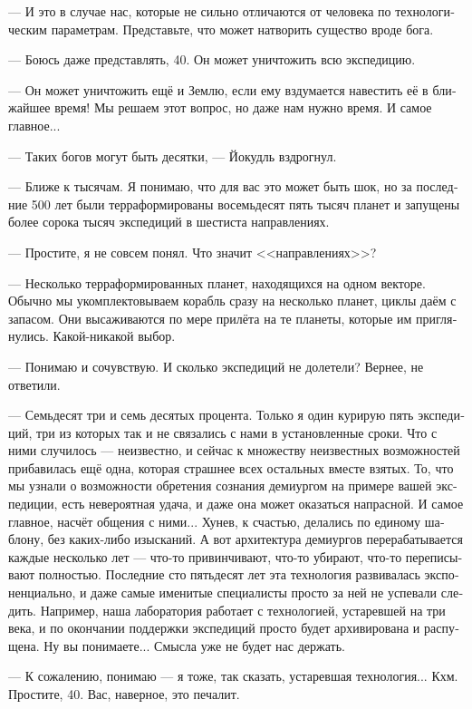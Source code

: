 \documentclass[a4paper,12pt,fleqn]{book}\usepackage{polyglossia}\setdefaultlanguage[babelshorthands=true]{russian}\setotherlanguage{english}\defaultfontfeatures{Ligatures=TeX,Mapping=tex-text}\usepackage{xcolor}\newcommand{\ml}[3]{#2}
\begin{document}
--- И это в случае нас, которые не сильно отличаются от человека по технологическим параметрам.
Представьте, что может натворить существо вроде бога.

--- Боюсь даже представлять, 40.
Он может уничтожить всю экспедицию.

--- Он может уничтожить ещё и Землю, если ему вздумается навестить её в ближайшее время!
Мы решаем этот вопрос, но даже нам нужно время.
И самое главное...

\ml{$0$}
{--- Таких богов могут быть десятки, --- Йокудль вздрогнул.}
{``There may be dozens of such gods,'' Jökull shuddered.}

\ml{$0$}
{--- Ближе к тысячам.}
{``Closer to thousands.}
Я понимаю, что для вас это может быть шок, но за последние 500 лет были терраформированы восемьдесят пять тысяч планет и запущены более сорока тысяч экспедиций в шестиста направлениях.

--- Простите, я не совсем понял.
Что значит <<направлениях>>?

--- Несколько терраформированных планет, находящихся на одном векторе.
Обычно мы укомплектовываем корабль сразу на несколько планет, циклы даём с запасом.
Они высаживаются по мере прилёта на те планеты, которые им приглянулись.
Какой-никакой выбор.

--- Понимаю и сочувствую.
И сколько экспедиций не долетели?
Вернее, не ответили.

--- Семьдесят три и семь десятых процента.
Только я один курирую пять экспедиций, три из которых так и не связались с нами в установленные сроки.
Что с ними случилось --- неизвестно, и сейчас к множеству неизвестных возможностей прибавилась ещё одна, которая страшнее всех остальных вместе взятых.
То, что мы узнали о возможности обретения сознания демиургом на примере вашей экспедиции, есть невероятная удача, и даже она может оказаться напрасной.
И самое главное, насчёт общения с ними...
Хунев, к счастью, делались по единому шаблону, без каких-либо изысканий.
А вот архитектура демиургов перерабатывается каждые несколько лет --- что-то привинчивают, что-то убирают, что-то переписывают полностью.
Последние сто пятьдесят лет эта технология развивалась экспоненциально, и даже самые именитые специалисты просто за ней не успевали следить.
Например, наша лаборатория работает с технологией, устаревшей на три века, и по окончании поддержки экспедиций просто будет архивирована и распущена.
Ну вы понимаете...
Смысла уже не будет нас держать.

--- К сожалению, понимаю --- я тоже, так сказать, устаревшая технология...
Кхм.
Простите, 40.
Вас, наверное, это печалит.
\end{document}
